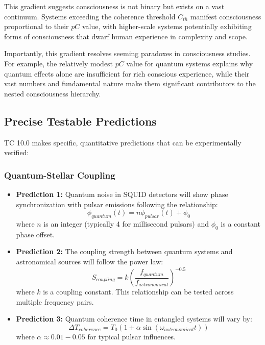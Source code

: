 \documentclass[12pt]{article}
\begin{document}
This gradient suggests consciousness is not binary but exists on a vast continuum. Systems exceeding the coherence threshold $C_{th}$ manifest consciousness proportional to their $pC$ value, with higher-scale systems potentially exhibiting forms of consciousness that dwarf human experience in complexity and scope.

Importantly, this gradient resolves seeming paradoxes in consciousness studies. For example, the relatively modest $pC$ value for quantum systems explains why quantum effects alone are insufficient for rich conscious experience, while their vast numbers and fundamental nature make them significant contributors to the nested consciousness hierarchy.

\subsection{Precise Testable Predictions}

TC 10.0 makes specific, quantitative predictions that can be experimentally verified:

\subsubsection{Quantum-Stellar Coupling}

\begin{itemize}
    \item \textbf{Prediction 1:} Quantum noise in SQUID detectors will show phase synchronization with pulsar emissions following the relationship:
    \begin{equation}
    \phi_{quantum}(t) = n\phi_{pulsar}(t) + \phi_0
    \end{equation}
    where $n$ is an integer (typically 4 for millisecond pulsars) and $\phi_0$ is a constant phase offset.
    
    \item \textbf{Prediction 2:} The coupling strength between quantum systems and astronomical sources will follow the power law:
    \begin{equation}
    S_{coupling} = k\left(\frac{f_{quantum}}{f_{astronomical}}\right)^{-0.5}
    \end{equation}
    where $k$ is a coupling constant. This relationship can be tested across multiple frequency pairs.
    
    \item \textbf{Prediction 3:} Quantum coherence time in entangled systems will vary by:
    \begin{equation}
    \Delta T_{coherence} = T_0(1 + \alpha\sin(\omega_{astronomical}t))
    \end{equation}
    where $\alpha \approx 0.01-0.05$ for typical pulsar influences.
\end{itemize}
\end{document}
